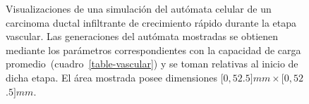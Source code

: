 \begin{figure}[!ht]
\begin{center}
\vspace*{-0.25cm}
\end{center}\vspace*{-0.6cm}
\caption[Visualizaciones de una simulaci\'on del aut\'omata celular de un carcinoma ductal infiltrante de crecimiento r\'apido durante la etapa vascular]{Visualizaciones de una simulaci\'on del aut\'omata celular de un carcinoma ductal infiltrante de crecimiento r\'apido durante la etapa vascular. Las generaciones del aut\'omata mostradas se obtienen mediante los par\'ametros correspondientes con la capacidad de carga promedio~(cuadro~\ref{table-vascular}) y se toman relativas al inicio de dicha etapa. El \'area mostrada posee dimensiones $[0,52$.$5]mm \times [0,52$.$5]mm$.}
\label{fig-vascular-automata}
\end{figure}

